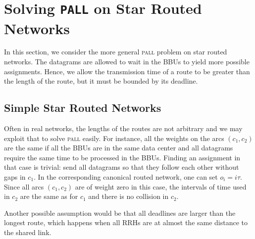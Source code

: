 \documentclass[a4paper,10pt]{journal}
\newcommand\pall{\textsc{pall}\xspace}
\begin{document}
         \section{Solving \texttt{PALL} on Star Routed Networks}\label{sec:PALL}
    
    In this section, we consider the more general \pall problem on star routed networks. The datagrams are allowed to wait in the BBUs to yield more possible assignments. Hence, we allow the transmission time of a route to be greater than the length of the route, but it must be bounded by its deadline.


	\subsection{Simple Star Routed Networks}
		

	Often in real networks, the lengths of the routes are not arbitrary and we may exploit that to solve \pall easily. For instance, all the weights on the arcs $(c_1,c_2)$ are the same if all the BBUs are in the same data center and all datagrams require the same time to be processed in the BBUs.
    Finding an assignment in that case is trivial: send all datagrams so that they follow each other without gaps in $c_1$. In the corresponding canonical routed network, one can set $o_i = i\tau$.  Since all arcs $(c_1,c_2)$ are of weight zero in this case, the intervals of time used in $c_2$ are the same as for $c_1$ and there is no collision in $c_2$.

	Another possible assumption would be that all deadlines are larger than the longest route, which happens when all RRHs are at almost the same distance to the shared link.
\end{document}
